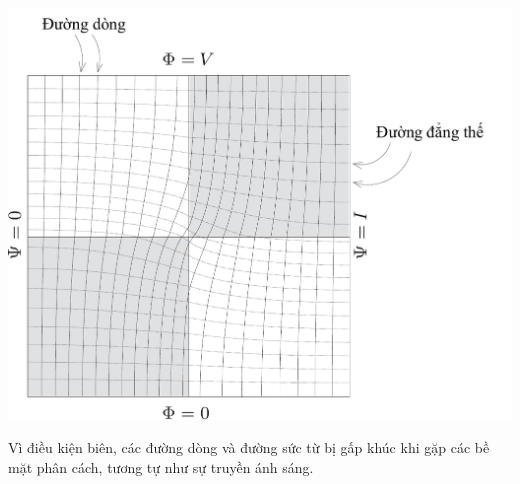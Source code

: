 \begin{loigiai}
\begin{itemize}
    \begin{center}
        \includegraphics[scale=0.6]{Anh/Nam2.pdf}
    \end{center}
     Vì điều kiện biên, các đường dòng và đường sức từ bị gấp khúc khi gặp các bề mặt phân cách, tương tự như sự truyền ánh sáng.
  \end{itemize}
\end{loigiai}

